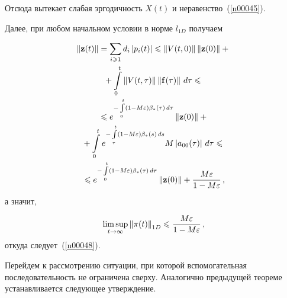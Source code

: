 \begin{multicols}{2}
Отсюда вытекает слабая эргодичность  $X(t)$ и неравенство~(\ref{n00045}).

Далее, при любом начальном условии в норме  $l_{1D}$ получаем

\vspace*{-1pt}

\noindent
\begin{multline*}
\left\|{\bf z}(t)\right\| =  \sum_{i \ge 1} d_i \left|p_i(t)\right|
\le \left\|V(t,0)\right\| \left\|{\bf z}(0)\right\| +{}\\[-1pt]
{}+ \int\limits_0^t
\left\|V(t,\tau)\right\| \left\|{\bf f}(\tau)\right\|\, d\tau \le{}\\[-1pt]
{}\le 
 e^{-\int\limits_0^t \left(1- M\varepsilon\right) \beta_* (\tau)\, d\tau}\left\|{\bf z}(0)\right\| +{}\\[-1pt]
 {}+
\int\limits_0^t e^{-\int\limits_\tau^t\left(1- M\varepsilon\right) \beta_* (s)\, d
s}  M \left|a_{00}(\tau)\right| \, d\tau  \le {}\\[-1pt]
{}\le  e^{-\int\limits_0^t  \left(1- M\varepsilon\right) \beta_* (\tau)\, d\tau}\left\|{\bf z}(0)\right\| +
 \fr{M\varepsilon}{1-M\varepsilon}\,,
\end{multline*}
а значит,

\vspace*{-1pt}

\noindent
\begin{equation*}
\limsup_{t \to \infty} \left\|{\bf \pi}(t)\right\|_{1D} \le
 \frac{M\varepsilon}{1-M\varepsilon}\,,
\end{equation*}
откуда следует~(\ref{n00048}).

\bigskip

Перейдем к рассмотрению ситуации, при которой вспомогательная
последовательность не ограничена сверху. Аналогично предыдущей
теореме  устанавливается следующее утверждение.

\medskip


\end{multicols}
